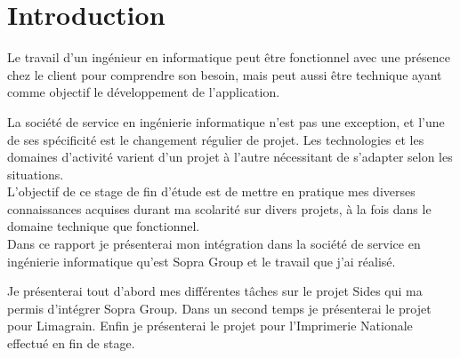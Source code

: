 \cleardoublepage

\chapter*{Introduction}




Le travail d'un ingénieur en informatique peut être fonctionnel avec une présence chez le client pour comprendre son besoin, mais peut aussi être technique ayant comme objectif le développement de l'application.

La société de service en ingénierie informatique n'est pas une exception, et l'une de ses spécificité est le changement régulier de projet.
Les technologies et les domaines d'activité varient d'un projet à l'autre nécessitant de s'adapter selon les situations.
\\



L'objectif de ce stage de fin d'étude est de mettre en pratique mes diverses connaissances acquises durant ma scolarité sur divers projets, à la fois dans le domaine technique que fonctionnel.
\\


Dans ce rapport je présenterai mon intégration dans la société de service en ingénierie informatique qu'est Sopra Group et le travail que j'ai réalisé.

Je présenterai tout d'abord mes différentes tâches sur le projet Sides qui ma permis d'intégrer Sopra Group.
Dans un second temps je présenterai le projet pour Limagrain.
Enfin je présenterai le projet pour l'Imprimerie Nationale effectué en fin de stage.